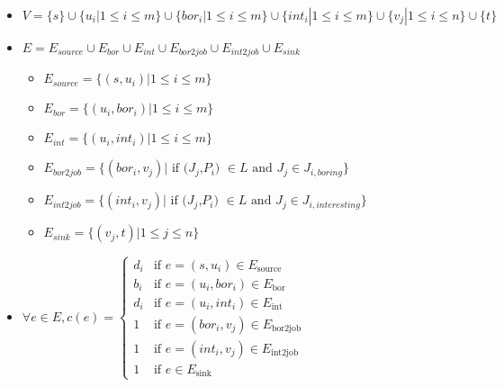 \documentclass[11pt, fleqn]{article}
\begin{document}
\begin{itemize}
    \item $V = \{s\} \cup \{u_i | 1 \leq i \leq  m\} \cup \{bor_i | 1 \leq i \leq m\} \cup \{int_i | 1 \leq i \leq m\} \cup \{v_j | 1 \leq i \leq n \} \cup \{t\}$
    
    \item $E = E_{source} \cup E_{bor} \cup E_{int} \cup E_{bor2job} \cup E_{int2job} \cup E_{sink}$
    \begin{itemize}
        \item $E_{source} = \{(s,u_i) | 1 \leq i \leq m\}$
        
        \item $E_{bor} = \{(u_i,bor_i) | 1 \leq i \leq m\}$
        
        \item $E_{int} = \{(u_i,int_i) | 1 \leq i \leq m\}$
        
        \item $E_{bor2job} = \{(bor_i,v_j) | \text{ if ($J_j$,$P_i$) $\in L$ and $J_j \in J_{i,boring}$} \}$
        
        \item $E_{int2job} = \{(int_i,v_j) | \text{ if ($J_j$,$P_i$) $\in L$ and $J_j \in J_{i,interesting}$}\}$
        
        \item $E_{sink} = \{(v_j,t) | 1 \leq j \leq n\}$
    \end{itemize}
    
    \item $\forall e\in E, c(e)=\begin{cases}
    d_i & \text{if } e = (s,u_i) \in E_{\text{source}}\\
    b_i & \text{if } e = (u_i,bor_i) \in E_{\text{bor}}\\
    d_i & \text{if } e = (u_i,int_i) \in E_{\text{int}}\\
    1 & \text{if } e = (bor_i,v_j) \in E_{\text{bor2job}}\\
    1 & \text{if } e = (int_i,v_j) \in E_{\text{int2job}}\\
    1 & \text{if } e \in E_{\text{sink}}
    \end{cases}$
\end{itemize}
\end{document}
